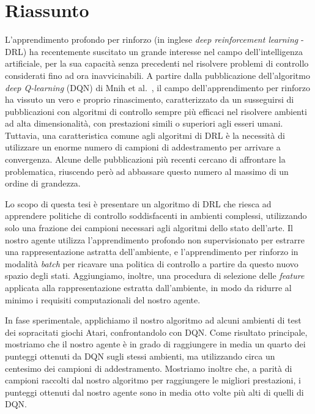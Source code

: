 \newpage
\chapter*{Riassunto}


L'apprendimento profondo per rinforzo (in inglese \textit{deep reinforcement 
learning} - DRL) ha recentemente suscitato un grande interesse nel campo 
dell'intelligenza artificiale, per la sua capacit\`a senza precedenti nel 
risolvere problemi di controllo considerati fino ad ora inavvicinabili.
A partire dalla pubblicazione dell'algoritmo \textit{deep Q-learning} (DQN) di 
Mnih et al.\ \cite{mnih2015human}, il campo dell'apprendimento per rinforzo ha 
vissuto un vero e proprio rinascimento, caratterizzato da un susseguirsi di 
pubblicazioni con algoritmi di controllo sempre pi\`u efficaci nel risolvere 
ambienti ad alta dimensionalit\`a, con prestazioni simili o superiori agli esseri 
umani. 
Tuttavia, una caratteristica comune agli algoritmi di DRL \`e la 
necessit\`a di utilizzare un enorme numero di campioni di addestramento per
arrivare a convergenza. Alcune delle pubblicazioni pi\`u recenti cercano di 
affrontare la problematica, riuscendo per\`o ad abbassare questo numero al 
massimo di un ordine di grandezza.

Lo scopo di questa tesi \`e presentare un algoritmo di DRL che riesca ad 
apprendere politiche di controllo soddisfacenti in ambienti complessi, 
utilizzando solo una frazione dei campioni necessari agli algoritmi dello stato 
dell'arte. 
Il nostro agente utilizza l'apprendimento profondo non supervisionato per 
estrarre una rappresentazione astratta dell'ambiente, e l'apprendimento per 
rinforzo in modalit\`a \textit{batch} per ricavare una politica di controllo 
a partire da questo nuovo spazio degli stati. 
Aggiungiamo, inoltre, una procedura di selezione delle \textit{feature} 
applicata alla rappresentazione estratta dall'ambiente, in modo da ridurre al 
minimo i requisiti computazionali del nostro agente. 

In fase sperimentale, applichiamo il nostro algoritmo ad alcuni ambienti di test 
dei sopracitati giochi Atari, confrontandolo con DQN. 
Come risultato principale, mostriamo che il nostro agente \`e in grado di 
raggiungere in media un quarto dei punteggi ottenuti da DQN sugli stessi 
ambienti, ma utilizzando circa un centesimo dei campioni di addestramento.
Mostriamo inoltre che, a parit\`a di campioni raccolti dal nostro algoritmo per
raggiungere le migliori prestazioni, i punteggi ottenuti dal nostro agente sono 
in media otto volte pi\`u alti di quelli di DQN. 

